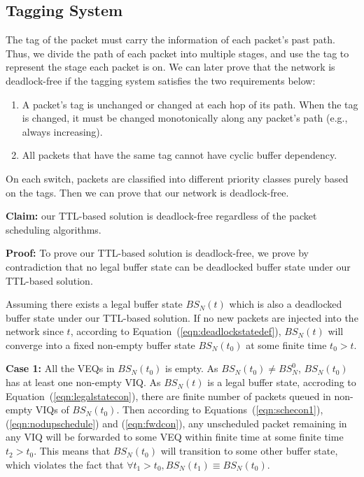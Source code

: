 \subsection{Tagging System}

The tag of the packet must carry the information of each packet's past path. Thus, we divide the path of each packet into multiple stages,
and use the tag to represent the stage each packet is on. We can later prove that the network is deadlock-free if the tagging system satisfies
the two requirements below:

\begin{enumerate}

	\item A packet's tag is unchanged or changed at each hop of its path. When the tag is changed, it must be changed monotonically along any packet’s path (e.g., always increasing).

	\item All packets that have the same tag cannot have cyclic buffer dependency.

\end{enumerate}

On each switch, packets are classified into different priority classes purely based on the tags. Then we can prove that our network is deadlock-free.


 

\textbf{Claim:} our TTL-based solution is deadlock-free regardless of the packet scheduling algorithms.

\textbf{Proof:} To prove our TTL-based solution is deadlock-free, we prove by contradiction that no legal buffer state can be deadlocked buffer state under our TTL-based solution.

Assuming there exists a legal buffer state  $BS_N(t)$ which is also a deadlocked buffer state under our TTL-based solution. If no new packets are injected into the network since $t$, according to Equation~(\ref{eqn:deadlockstatedef}), $BS_N(t)$ will converge into a fixed non-empty buffer state $BS_N(t_0)$ at some finite time $t_0>t$. 


\textbf{Case 1:} All the VEQs in $BS_N(t_0)$ is empty. As $BS_N(t_0) \neq BS^0_N$, $BS_N(t_0)$ has at least one non-empty VIQ. As $BS_N(t)$ is a legal buffer state, accroding to Equation~(\ref{eqn:legalstatecon}), there are finite number of packets queued in non-empty VIQs of $BS_N(t_0)$. Then according to Equations~(\ref{eqn:schecon1}), (\ref{eqn:nodupschedule}) and (\ref{eqn:fwdcon}), any unscheduled packet remaining in any VIQ will be forwarded to some VEQ within finite time at some finite time $t_2>t_0$. This means that $BS_N(t_0)$ will transition to some other buffer state, which violates the fact that $\forall t_1>t_0, BS_N(t_1)\equiv BS_N(t_0)$.

